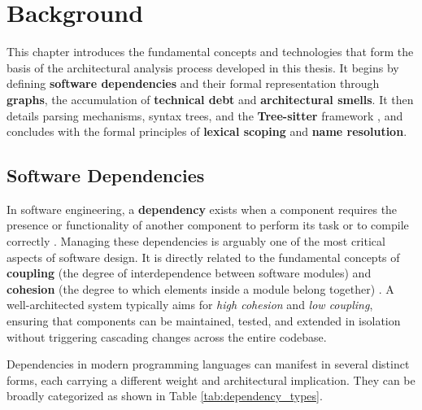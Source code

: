 \chapter{Background}
\label{ch:background}

This chapter introduces the fundamental concepts and technologies
that form the basis of the architectural analysis process developed
in this thesis. It begins by defining \textbf{software dependencies}
and their formal representation through \textbf{graphs}, the
accumulation of \textbf{technical debt} and \textbf{architectural
smells}. It then details parsing mechanisms, syntax trees, and the
\textbf{Tree-sitter} framework \cite{brunsfeld_treesitter_2018}, and
concludes with the formal principles of \textbf{lexical scoping} and
\textbf{name resolution}.

\section{Software Dependencies}
\label{sec:software_dependencies}

In software engineering, a \textbf{dependency} exists when a
component requires the presence or functionality of another component
to perform its task or to compile correctly \cite{martin_clean_2018}.
Managing these dependencies is arguably one of the most critical
aspects of software design. It is directly related to the fundamental
concepts of \textbf{coupling} (the degree of interdependence between
software modules) and \textbf{cohesion} (the degree to which elements
inside a module belong together) \cite{stevens_structured_1974}. A
well-architected system typically aims for \textit{high cohesion} and
\textit{low coupling}, ensuring that components can be maintained,
tested, and extended in isolation without triggering cascading
changes across the entire codebase.

Dependencies in modern programming languages can manifest in several
distinct forms, each carrying a different weight and architectural
implication. They can be broadly categorized as shown in Table
\ref{tab:dependency_types}.

